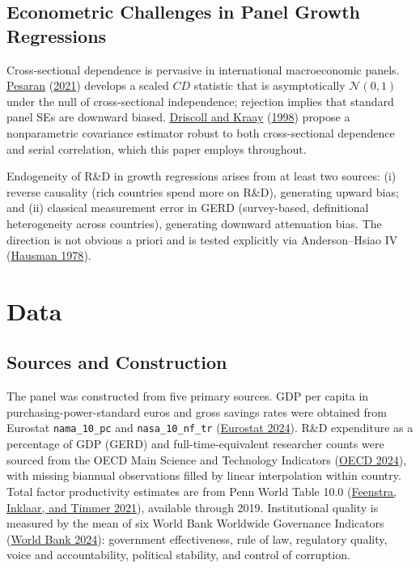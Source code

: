\documentclass[
  11pt,
]{article}
\begin{document}
\hypertarget{econometric-challenges-in-panel-growth-regressions}{%
\subsection{Econometric Challenges in Panel Growth Regressions}\label{econometric-challenges-in-panel-growth-regressions}}

Cross-sectional dependence is pervasive in international macroeconomic panels. \protect\hyperlink{ref-pesaran2021}{Pesaran} (\protect\hyperlink{ref-pesaran2021}{2021}) develops a scaled \(CD\) statistic that is asymptotically \(\mathcal{N}(0,1)\) under the null of cross-sectional independence; rejection implies that standard panel SEs are downward biased. \protect\hyperlink{ref-driscollkraay1998}{Driscoll and Kraay} (\protect\hyperlink{ref-driscollkraay1998}{1998}) propose a nonparametric covariance estimator robust to both cross-sectional dependence and serial correlation, which this paper employs throughout.

Endogeneity of R\&D in growth regressions arises from at least two sources: (i) reverse causality (rich countries spend more on R\&D), generating upward bias; and (ii) classical measurement error in GERD (survey-based, definitional heterogeneity across countries), generating downward attenuation bias. The direction is not obvious a priori and is tested explicitly via Anderson--Hsiao IV (\protect\hyperlink{ref-hausman1978}{Hausman 1978}).

\hypertarget{sec:data}{%
\section{Data}\label{sec:data}}

\hypertarget{sources-and-construction}{%
\subsection{Sources and Construction}\label{sources-and-construction}}

The panel was constructed from five primary sources. GDP per capita in purchasing-power-standard euros and gross savings rates were obtained from Eurostat \texttt{nama\_10\_pc} and \texttt{nasa\_10\_nf\_tr} (\protect\hyperlink{ref-eurostat_gdp}{Eurostat 2024}). R\&D expenditure as a percentage of GDP (GERD) and full-time-equivalent researcher counts were sourced from the OECD Main Science and Technology Indicators (\protect\hyperlink{ref-oecd_msti}{OECD 2024}), with missing biannual observations filled by linear interpolation within country. Total factor productivity estimates are from Penn World Table 10.0 (\protect\hyperlink{ref-pwt100}{Feenstra, Inklaar, and Timmer 2021}), available through 2019. Institutional quality is measured by the mean of six World Bank Worldwide Governance Indicators (\protect\hyperlink{ref-worldbank_wgi}{World Bank 2024}): government effectiveness, rule of law, regulatory quality, voice and accountability, political stability, and control of corruption.
\end{document}
